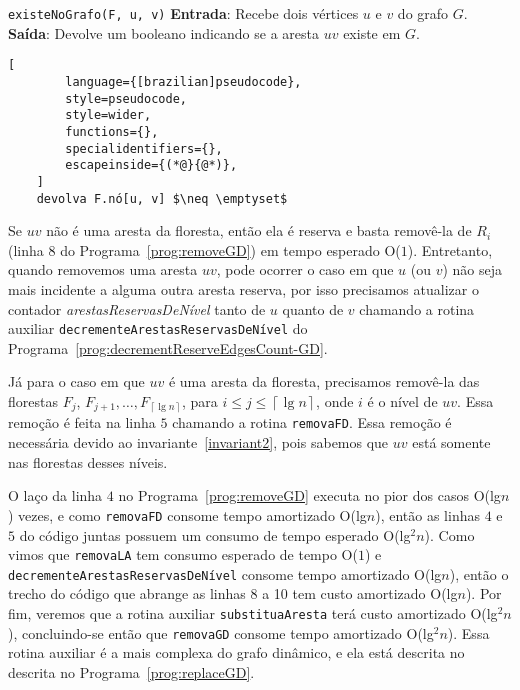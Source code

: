 \begin{programruledcaption}{\texttt{existeNoGrafo(F, u, v)} \label{prog:existGD}}
    \noindent\textbf{Entrada}: Recebe dois vértices $u$ e $v$ do grafo $G$. \\
    \textbf{Saída}: Devolve um booleano indicando se a aresta $uv$ existe em $G$.
    \vspace{-0.5\baselineskip}
    \begin{lstlisting}[
        language={[brazilian]pseudocode},
        style=pseudocode,
        style=wider,
        functions={},
        specialidentifiers={},
        escapeinside={(*@}{@*)},
    ]
    devolva F.nó[u, v] $\neq \emptyset$ 
    \end{lstlisting}
    \vspace{-0.5\baselineskip}
\end{programruledcaption}

Se $uv$ não é uma aresta da floresta, então ela é reserva e basta removê-la de $R_i$ (linha $8$ do Programa~\ref{prog:removeGD}) em tempo esperado O($1$). Entretanto, quando removemos uma aresta $uv$, pode ocorrer o caso em que $u$ (ou $v$) não seja mais incidente a alguma outra aresta reserva, por isso precisamos atualizar o contador \textit{arestasReservasDeNível} tanto de $u$ quanto de $v$ chamando a rotina auxiliar \texttt{decrementeArestasReservasDeNível} do Programa~\ref{prog:decrementReserveEdgesCount-GD}.

Já para o caso em que $uv$ é uma aresta da floresta, precisamos removê-la das florestas $F_j$, $F_{j+1}, \ldots, F_{\left\lceil \lg n \right\rceil}$, para $i \leq j \leq \left\lceil \lg n \right\rceil$, onde $i$ é o nível de $uv$. Essa remoção é feita na linha $5$ chamando a rotina \texttt{removaFD}. Essa remoção é necessária devido ao invariante~\ref{invariant2}, pois sabemos que $uv$ está somente nas florestas desses níveis. 

O laço da linha $4$ no Programa~\ref{prog:removeGD} executa no pior dos casos O(lg$n$) vezes, e como \texttt{removaFD} consome tempo amortizado O(lg$n$), então as linhas $4$ e $5$ do código juntas possuem um consumo de tempo esperado O(lg$^2n$). Como vimos que \texttt{removaLA} tem consumo esperado de tempo O($1$) e \texttt{decrementeArestasReservasDeNível} consome tempo amortizado O(lg$n$), então o trecho do código que abrange as linhas 8 a 10 tem custo amortizado O(lg$n$). Por fim, veremos que a rotina auxiliar \texttt{substituaAresta} terá custo amortizado O(lg$^2n$), concluindo-se então que \texttt{removaGD} consome tempo amortizado O(lg$^2n$). Essa rotina auxiliar é a mais complexa do grafo dinâmico, e ela está descrita no descrita no Programa~\ref{prog:replaceGD}.

